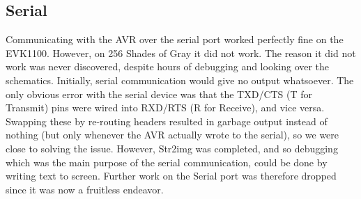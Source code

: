 \subsection{Serial}
\label{sec:avr-serial-issues}
Communicating with the AVR over the serial port worked perfectly fine on the
EVK1100. However, on 256 Shades of Gray it did not work. The reason it did not
work was never discovered, despite hours of debugging and looking over the
schematics. Initially, serial communication would give no output whatsoever. The
only obvious error with the serial device was that the TXD/CTS (T for Transmit)
pins were wired into RXD/RTS (R for Receive), and vice versa. Swapping these by
re-routing headers resulted in garbage output instead of nothing (but only
whenever the AVR actually wrote to the serial), so we were close to solving the
issue. However, Str2img was completed, and so debugging which was the main
purpose of the serial communication, could be done by writing text to
screen. Further work on the Serial port was therefore dropped since it was now a
fruitless endeavor.
